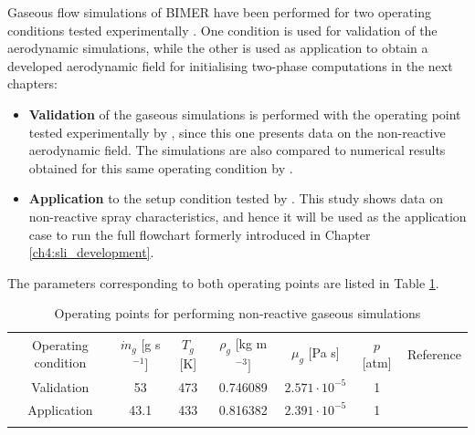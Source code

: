 Gaseous flow simulations of BIMER have been performed for two operating conditions tested experimentally . One condition is used for validation of the aerodynamic simulations, while the other is used as application to obtain a developed aerodynamic field for initialising two-phase computations in the next chapters:

\begin{itemize}

	\item \textbf{Validation} of the gaseous simulations is performed with the operating point tested experimentally by , since this one presents data on the non-reactive aerodynamic field. The simulations are also compared to numerical results obtained for this same operating condition by . 
	
	\item \textbf{Application} to the setup condition tested by . This study shows data on non-reactive spray characteristics, and hence it will be used as the application case to run the full flowchart formerly introduced in Chapter \ref{ch4:sli_development}. %

\end{itemize}

The parameters corresponding to both operating points are listed in Table \ref{tab:gaseous_operating_points_BIMER}. 

\begin{table}[!h]
\centering
\caption{Operating points for performing non-reactive gaseous simulations}
\begin{tabular}{ccccccc}
\thickhline
Operating condition    & $\dot{m}_g$ [g s$^{-1}$] & $T_g$ [K] & $\rho_g$ [kg m$^{-3}]$  & $\mu_g$ [Pa s] & $p$ [atm]  & Reference\\
\thickhline
Validation &   53 & 473 & 0.746089 & $2.571 \cdot 10^{-5}$ & 1 & \\
Application  & 43.1 & 433 & 0.816382 & $2.391 \cdot 10^{-5}$ & 1 &  \\
\thickhline
\end{tabular}
\label{tab:gaseous_operating_points_BIMER}
\end{table}



